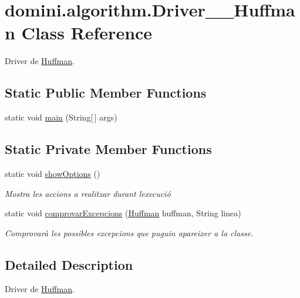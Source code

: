 \hypertarget{classdomini_1_1algorithm_1_1Driver____Huffman}{}\section{domini.\+algorithm.\+Driver\+\_\+\+\_\+\+Huffman Class Reference}
\label{classdomini_1_1algorithm_1_1Driver____Huffman}


Driver de \hyperlink{classHuffman}{Huffman}.  


\subsection*{Static Public Member Functions}
\begin{DoxyCompactItemize}
\item 
static void \hyperlink{classdomini_1_1algorithm_1_1Driver____Huffman_a2fe727dd4ebafefce42bdc94f5dd80fe}{main} (String\mbox{[}$\,$\mbox{]} args)
\end{DoxyCompactItemize}
\subsection*{Static Private Member Functions}
\begin{DoxyCompactItemize}
\item 
static void \hyperlink{classdomini_1_1algorithm_1_1Driver____Huffman_a0504e4a97aa7c7a0ad7c1a75187adb10}{show\+Options} ()
\begin{DoxyCompactList}\small\item\em Mostra les accions a realitzar durant l\textquotesingle{}execució \end{DoxyCompactList}\item 
static void \hyperlink{classdomini_1_1algorithm_1_1Driver____Huffman_a5d56f18f1d8f96dfc735b9a127094319}{comprovar\+Excepcions} (\hyperlink{classHuffman}{Huffman} huffman, String linea)
\begin{DoxyCompactList}\small\item\em Comprovarà les possibles excepcions que puguin apareixer a la classe. \end{DoxyCompactList}\end{DoxyCompactItemize}


\subsection{Detailed Description}
Driver de \hyperlink{classHuffman}{Huffman}. 

